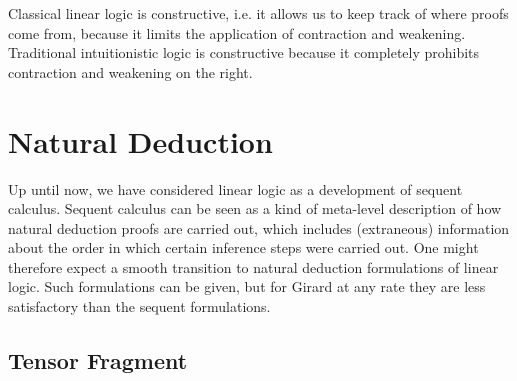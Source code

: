 Classical linear logic is constructive, i.e. it allows us to keep
track of where proofs come from, because it limits the application
of contraction and weakening.  Traditional intuitionistic logic is
constructive because it completely prohibits contraction and weakening
on the right.

 
\section{Natural Deduction}

Up until now, we have considered linear logic as a development of
sequent calculus.  Sequent calculus can be seen as a kind of
meta-level description of how natural deduction proofs are carried
out, which includes (extraneous) information about the order in which
certain inference steps were carried out.  One might therefore expect
a smooth transition to natural deduction formulations of linear logic.
Such formulations can be given, but for Girard at any rate they are
less satisfactory than the sequent formulations.

\subsection{Tensor Fragment}

